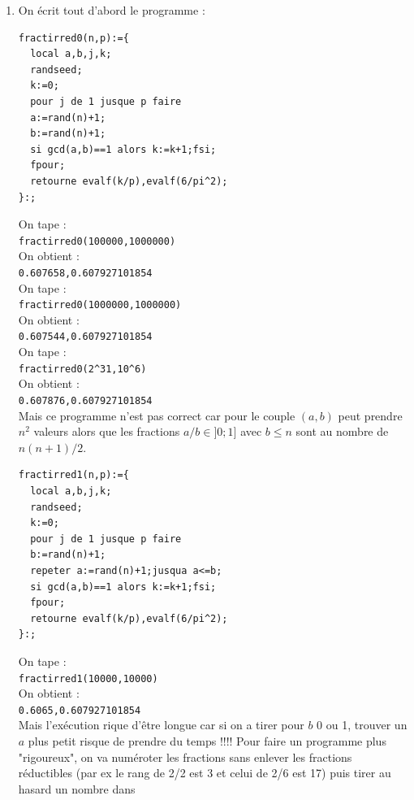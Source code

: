 \documentclass[a4paper,11pt]{book}
\begin{document}
\begin{enumerate}
Ce qui veut dire que $y=0.283029041082*x^-2.01348683765$ approche la courbe 
$y=f(x)$, c'est \`a dire que $f(1/n)\simeq 0.283029041082*n^{2.01348683765}$.\\
On tape : {\tt evalf(3/pi\verb|^|2)}\\
On obtient : {\tt 0.303963550927}
\item On \'ecrit tout d'abord le programme :
\begin{verbatim}
fractirred0(n,p):={
  local a,b,j,k;
  randseed;
  k:=0;
  pour j de 1 jusque p faire
  a:=rand(n)+1;
  b:=rand(n)+1;
  si gcd(a,b)==1 alors k:=k+1;fsi;
  fpour;
  retourne evalf(k/p),evalf(6/pi^2);
}:;
\end{verbatim}
On tape :\\
{\tt fractirred0(100000,1000000)}\\
On obtient :\\
{\tt 0.607658,0.607927101854}\\
On tape :\\
{\tt fractirred0(1000000,1000000)}\\
On obtient :\\
{\tt 0.607544,0.607927101854}\\
On tape :\\
{\tt fractirred0(2\verb|^|31,10\verb|^|6)}\\
On obtient :\\
{\tt 0.607876,0.607927101854}\\
Mais ce programme n'est pas correct car pour le couple $(a,b)$ peut prendre 
$n^2$ valeurs alors que les fractions $a/b \in ]0;1]$ avec $b\leq n$ sont au 
    nombre de $n(n+1)/2$.\\
\begin{verbatim}
fractirred1(n,p):={
  local a,b,j,k;
  randseed;
  k:=0;
  pour j de 1 jusque p faire
  b:=rand(n)+1;
  repeter a:=rand(n)+1;jusqua a<=b;
  si gcd(a,b)==1 alors k:=k+1;fsi;
  fpour;
  retourne evalf(k/p),evalf(6/pi^2);
}:;
\end{verbatim}
On tape :\\
{\tt fractirred1(10000,10000)}\\
On obtient :\\
{\tt 0.6065,0.607927101854}\\
Mais l'ex\'ecution rique d'\^etre longue car si on a tirer pour $b$ 0 ou 1, 
trouver un $a$ plus petit risque de prendre du temps !!!! 
Pour faire un programme plus "rigoureux", on va num\'eroter les fractions sans 
enlever les fractions r\'eductibles (par ex le rang de 2/2 est 3 et celui de 2/6
est 17) puis tirer au hasard un nombre dans 

\end{enumerate}
\end{document}
